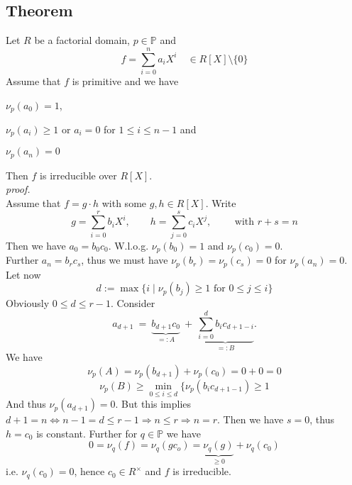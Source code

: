 \documentclass[12pt]{book}
\begin{document}
\begin{spacing}{1.3}
\subsection{Theorem} %
\titleformat{\subsection}{\normalfont\normalsize\bfseries}{}{0em}{#1 \thesubsection}
Let $R$ be a factorial domain, $p \in \mathbb{P}$ and $$f= \sum_{i=0}^n a_i X^{i} \quad \in R[X]\setminus \{0\}$$
Assume that $f$ is primitive and we have
\begin{compactenum}
\item $\nu_p(a_0)=1$,
\item $\nu_p(a_i)\geqslant 1 $ or $a_i=0$ for $1 \leqslant i \leqslant n-1$ and
\item $\nu_p(a_n)=0$
\end{compactenum}
Then $f$ is irreducible over $R[X]$.\\
\textit{proof.}\\
Assume that $f=g\cdot h$ with some $g,h \in R[X]$. Write 
$$g= \sum_{i=0}^r b_i X^{i}, \qquad h=\sum_{j=0}^s c_i X^{j}, \qquad \textrm{ with } r+s=n$$
Then we have $a_0=b_0c_0$. W.l.o.g. $\nu_p(b_0)=1$ and $\nu_p(c_0)=0$.\\
Further $a_n=b_r c_s$, thus we must have $\nu_p(b_r)=\nu_p(c_s)=0$ for $\nu_p(a_n)=0$. \\
Let now $$d:=\max\{i \mid \nu_p(b_j) \geqslant 1 \textrm{ for } 0 \leqslant j \leqslant i \}$$
Obviously $0 \leqslant d \leqslant r-1$. Consider
$$a_{d+1}\ =\ \underbrace{b_{d+1}c_0}_{=:A}\ +\ \underbrace{\sum_{i=0}^d b_i c_{d+1-i}}_{=:B}.$$
We have 
$$\nu_p(A)=\nu_p(b_{d+1})+\nu_p(c_0)=0+0=0$$
$$\nu_p(B) \geqslant \min_{0 \leqslant i \leqslant d}\{\nu_p(b_ic_{d+1-1})\geqslant 1$$
And thus $\nu_p(a_{d+1})=0$. But this implies $d+1=n \Leftrightarrow n-1 =d \leqslant r-1 \Rightarrow n\leqslant r \Rightarrow n=r$.
Then we have $s=0$, thus $h=c_0$ is constant. Further for $q \in \mathbb{P}$ we have
$$0=\nu_q(f)=\nu_q(gc_o)=\underbrace{\nu_q(g)}_{\geqslant 0}+\nu_q(c_0)$$
i.e. $\nu_q(c_0)=0$, hence $c_0 \in R^{\times}$ and $f$ is irreducible.


\end{spacing}
\end{document}
